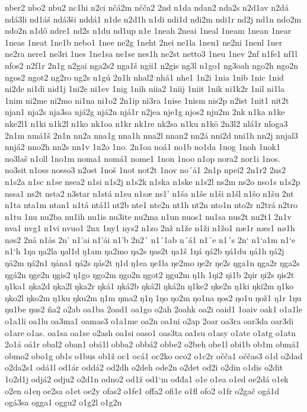 nber2
nbo2
nbu2
nc1hi
n2ci
nčá2m
nčča2
2nd
n1da
ndan2
nda2s
n2d1av
n2dá
ndá3li
nd1áš
ndá3ši
nddá1
n1de
n2d1h
n1di
ndi1d
ndi2m
ndi1r
nd2j
nd1n
ndo2m
ndo2n
n1dô
ndre1
nd2s
n1du
nd1up
n1e
1neah
2neai
1neal
1neam
1nean
1near
1neas
1neat
1ne1b
nebo1
1nee
ne2g
1neht
2nei
ne1la
1nen1
ne2ni
1nenl
1ner
ne2ra
nere1
ne3ri
1nes
1ne1sa
ne1se
nes1h
ne2st
netto3
1neu
1nev
2nf
n1fe1
nf1l
nfos2
n2f1r
2n1g
n2gai
nga2s2
nga1š
ngii1
n2gis
ng3l
n1go1
ng3oah
ngo2h
ngo2n
ngos2
ngot2
ng2ro
ng2s
n1gú
2n1h
nhal2
nhá1
nhe1
1n2i
1nia
1nib
1nic
1nid
ni2de
ni1di
nid1j
1ni2e
ni1ev
1nig
1nih
niia2
1niij
1niit
1nik
ni1k2r
1nil
ni1la
1nim
ni2me
ni2mo
ni1na
ni1o2
2n1ip
ni3ra
1nise
1nism
nis2p
n2ist
1nit1
nit2t
njan1
nja2s
nja3sa
njá2g
njá2n
njá1r
n2jea
nje1g
njos2
nju2m
2nk
n1ka
n1ke
nke2l1
n1ki
n1k2l
n1ko
nk1oa
n1kr
nk1re
nk2sa
n1ku
n1kö
2n3l2
nlá1r
nloga3
2n1m
nmá1š
2n1n
nn2a
nna1g
nna1h
nna2l
nnan2
nn2á
nni2d
nni1h
nn2j
nnjal3
nnjá2
nno2h
nn2s
nn1v
1n2o
1no.
2n1oa
noá1
no1b
no1da
1nog
1noh
1nok1
no3laš
n1oll
1no1m
noma1
nomá1
nome1
1non
1noo
n1op
nora2
nor1i
1nos.
no3sit
n1oss
nosso3
n2ost
1noš
1not
not2t
1nov
no´á1
2n1p
npei2
2n1r2
2ns2
n1s2a
n1sc
n1se
nsea2
n1si
n1s2j
n1s2k
n1ska
n1ske
n1s2l
ns2m
ns2o
nso1s
n1s2p
nssa1
ns2t
nsta2
n3star
n1stá
n1su
n1sæ
ns1'
n1ša
n1še
n1ši
n1šl
n1šo
n1šu
2nt
n1ta
nta1m
ntan1
n1tá
ntá1l
nt2b
nte1
nte2n
nt1h
nt2n
nto1n
nto2r
n2trá
n2tro
n1tu
1nu
nu2ba
nu1ih
nu1is
nu3ite
nu2ma
n1un
nuos1
nu1sa
nus2t
nu2t1
2n1v
nva1
nvg1
n1vi
nvuo1
2nx
1ny1
nys2
n1zo
2nž
n1že
n1ži
n1žo1
næ1r
næs1
nø1h
nøs2
2nå
n1ås
2n'
n1'ai
n1'ái
n1'b
2n2´
n1´1ab
n´á1
n1´e
n1´s
2n`
n1`a1m
n1`e
n1`h
1ŋa
ŋa2la
ŋal1d
ŋ1am
ŋa2mo
ŋa2s
ŋas2t
ŋa1š
1ŋá
ŋá2b
ŋá1du
ŋá1h
ŋá2j
ŋá2m
ŋá2n1
ŋána1
ŋá2s
ŋás2t
ŋ1d
ŋ1ea
ŋe1la
ŋe2mo
ŋe2r
ŋe2s
ŋga1n
ŋga2r
ŋga2s
ŋgá2n
ŋge2n
ŋgis2
ŋ1go
ŋgo2m
ŋgo2n
ŋgot2
ŋgu2m
ŋ1h
1ŋi2
ŋi1b
2ŋir
ŋi2s
ŋis2t
ŋ1ka1
ŋka2d
ŋka2l
ŋka2r
ŋká1
ŋká2b
ŋká2l
ŋká2n
ŋ1ke2
ŋke2n
ŋ1ki
ŋki2m
ŋ1ko
ŋko2l
ŋko2m
ŋ1ku
ŋku2m
ŋ1m
ŋma2
ŋ1ŋ
1ŋo
ŋo2m
ŋo1na
ŋos2
ŋo1u
ŋož1
ŋ1r
1ŋu
ŋu1be
ŋus2
ña2
o2ab
oa1ba
2oad1
oa1go
o2ah
2oahk
oa2i
oaid1
1oaiv
oak1
o1a1le
o1a1li
oa1lu
oa3ma1
oamas3
o1a1me
oa2n
oa1ni
o2ap
2oar
oa3ra
oar3da
oar3di
o1are
o1as.
oa1sa
oa1se
o2ash
oa1si
oaso1
oas3ta
oa1su
o1asy
o1ate
o1atg
o1atn
2o1á
oá1r
obal2
oban1
obá1l
obba2
obbá2
obbe2
o2beh
obe1l
obi1b
ob1m
obmá1
obmo2
obo1g
ob1s
o1bus
ob1ž
oc1
ocá1
oc2ko
oco2
o1c2r
očča1
oččas3
o1d
o2dad
o2da2s1
odá1l
od1ár
oddá2
od2dh
o2deh
ode2n
o2det
od2i
o2din
o1dis
o2dit
1o2d1j
odjá2
odju2
o2d1n
odno2
od1ž
od1`m
ođđa1
o1e
o1ea
o1ed
oe2dá
o1ek
o2en
o1eŋ
oe2sa
o1et
oe2y
ofas2
o1fe1
offa2
ofi1e
o1fl
ofo2
o1fr
o2gač
ogá1d
ogá3sa
ogga1
oggu2
o1g2l
o1g2n
